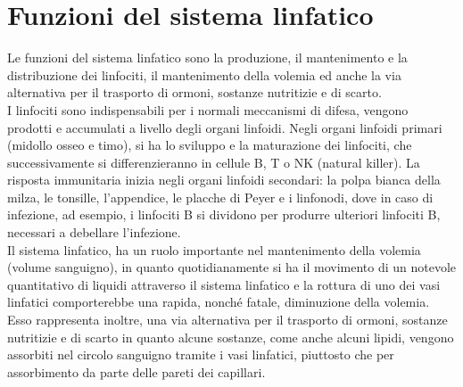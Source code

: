 \section{Funzioni del sistema linfatico}
Le funzioni del sistema linfatico sono la produzione, il mantenimento e la distribuzione dei linfociti, 
il mantenimento della volemia ed anche la via alternativa per il trasporto di ormoni,
sostanze nutritizie e di scarto\cite{BOOK1}.\\
I linfociti sono indispensabili per i normali meccanismi di difesa, vengono prodotti e accumulati a livello 
degli organi linfoidi. Negli organi linfoidi primari (midollo osseo e timo), si ha lo sviluppo e 
la maturazione dei linfociti, che successivamente si differenzieranno in cellule B, T o NK (natural killer)\cite{BOOK1}.
La risposta immunitaria inizia negli organi linfoidi secondari: la polpa bianca della milza, le tonsille, 
l’appendice, le placche di Peyer e i linfonodi, dove in caso di infezione, ad esempio,
i linfociti B si dividono per produrre ulteriori linfociti B, necessari a debellare l’infezione.\\
Il sistema linfatico, ha un ruolo importante nel mantenimento della volemia (volume sanguigno), in quanto 
quotidianamente si ha il movimento di un notevole quantitativo di liquidi attraverso il sistema linfatico e 
la rottura di uno dei vasi linfatici comporterebbe una rapida, nonché fatale, diminuzione della volemia\cite{BOOK1}.\\
Esso rappresenta inoltre, una via alternativa per il trasporto di ormoni, sostanze nutritizie e 
di scarto in quanto alcune sostanze, come anche alcuni lipidi, vengono assorbiti nel circolo sanguigno tramite 
i vasi linfatici, piuttosto che per assorbimento da parte delle pareti dei capillari\cite{BOOK1}.

